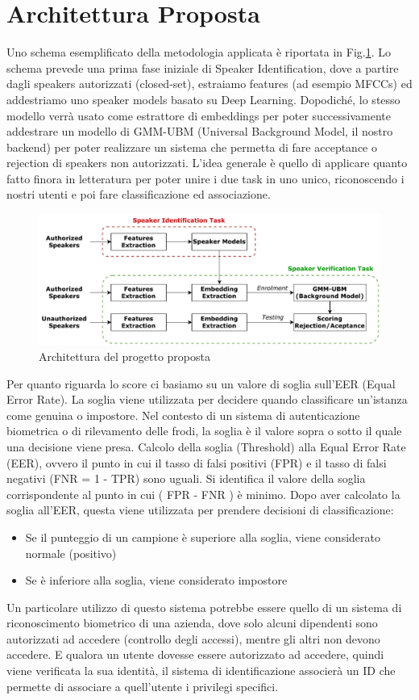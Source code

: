 \section{Architettura Proposta}
Uno schema esemplificato della metodologia applicata è riportata in Fig.\ref{fig:architettura}.
Lo schema prevede una prima fase iniziale di Speaker Identification, dove a partire dagli speakers autorizzati (closed-set), estraiamo
features (ad esempio MFCCs) ed addestriamo uno speaker models basato su Deep Learning. Dopodiché, lo stesso modello verrà usato come estrattore di embeddings
per poter successivamente addestrare un modello di GMM-UBM (Universal Background Model, il nostro backend) per poter realizzare un sistema che permetta di fare
acceptance o rejection di speakers non autorizzati. L'idea generale è quello di applicare quanto fatto finora in letteratura per poter unire i due task in uno unico,
riconoscendo i nostri utenti e poi fare classificazione ed associazione.
\begin{figure}[ht]
    \centering
    \includegraphics[width=1.0\textwidth]{./architettura.pdf}
    \caption{Architettura del progetto proposta}
    \label{fig:architettura}
\end{figure}
Per quanto riguarda lo score ci basiamo su un valore di soglia sull'EER (Equal Error Rate). La soglia viene utilizzata per decidere quando classificare un'istanza come genuina o impostore. Nel contesto di un sistema di autenticazione biometrica o di rilevamento delle frodi, la soglia è il valore sopra o sotto il quale una decisione viene presa.
Calcolo della soglia (Threshold) alla Equal Error Rate (EER), ovvero il punto in cui il tasso di falsi positivi (FPR) e il tasso di falsi negativi (FNR = 1 - TPR) sono uguali. Si identifica il valore della soglia corrispondente al punto in cui ( FPR - FNR ) è minimo.
Dopo aver calcolato la soglia all'EER, questa viene utilizzata per prendere decisioni di classificazione:
\begin{itemize}
    \item Se il punteggio di un campione è superiore alla soglia, viene considerato normale (positivo)
    \item Se è inferiore alla soglia, viene considerato impostore
\end{itemize}
Un particolare utilizzo di questo sistema potrebbe essere quello di un sistema di riconoscimento biometrico di una azienda, dove solo alcuni dipendenti
sono autorizzati ad accedere (controllo degli accessi), mentre gli altri non devono accedere. E qualora un utente dovesse essere autorizzato ad accedere,
quindi viene verificata la sua identità, il sistema di identificazione associerà un ID che permette di associare a quell'utente i privilegi specifici. \\
